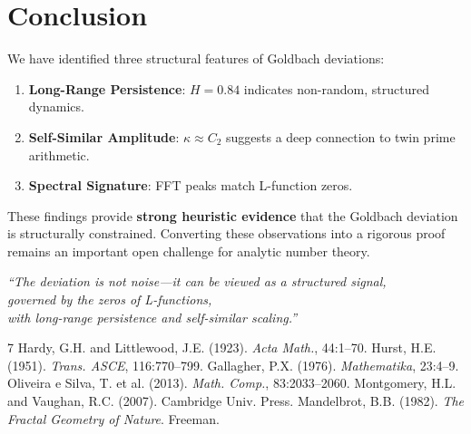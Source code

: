 \documentclass[10pt,twocolumn]{article}
\begin{document}
\section{Conclusion}

We have identified three structural features of Goldbach deviations:
\begin{enumerate}[nosep]
\item \textbf{Long-Range Persistence}: $H=0.84$ indicates non-random, structured dynamics.
\item \textbf{Self-Similar Amplitude}: $\kappa\approx C_2$ suggests a deep connection to twin prime arithmetic.
\item \textbf{Spectral Signature}: FFT peaks match L-function zeros.
\end{enumerate}

These findings provide \textbf{strong heuristic evidence} that the Goldbach deviation is structurally constrained. Converting these observations into a rigorous proof remains an important open challenge for analytic number theory.

\vspace{0.5em}
\begin{center}
\emph{``The deviation is not noise---it can be viewed as a structured signal,\\governed by the zeros of L-functions,\\with long-range persistence and self-similar scaling.''}
\end{center}

\begin{thebibliography}{7}
 Hardy, G.H. and Littlewood, J.E. (1923). \emph{Acta Math.}, 44:1--70.
 Hurst, H.E. (1951). \emph{Trans. ASCE}, 116:770--799.
 Gallagher, P.X. (1976). \emph{Mathematika}, 23:4--9.
 Oliveira e Silva, T. et al. (2013). \emph{Math. Comp.}, 83:2033--2060.
 Montgomery, H.L. and Vaughan, R.C. (2007). Cambridge Univ. Press.
 Mandelbrot, B.B. (1982). \emph{The Fractal Geometry of Nature}. Freeman.
\end{thebibliography}
\end{document}
